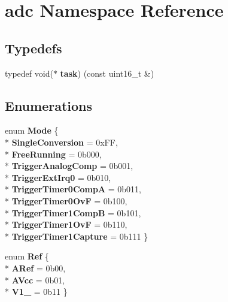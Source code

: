 \hypertarget{namespaceadc}{}\section{adc Namespace Reference}
\label{namespaceadc}
\subsection*{Typedefs}
\begin{DoxyCompactItemize}
\item 
typedef void($\ast$ {\bfseries task}) (const uint16\+\_\+t \&)\hypertarget{namespaceadc_a0e6e6773a0ed848acb0887f1ed3c76ae}{}\label{namespaceadc_a0e6e6773a0ed848acb0887f1ed3c76ae}

\end{DoxyCompactItemize}
\subsection*{Enumerations}
\begin{DoxyCompactItemize}
\item 
enum {\bfseries Mode} \{ \\*
{\bfseries Single\+Conversion} = 0x\+FF, 
\\*
{\bfseries Free\+Running} = 0b000, 
\\*
{\bfseries Trigger\+Analog\+Comp} = 0b001, 
\\*
{\bfseries Trigger\+Ext\+Irq0} = 0b010, 
\\*
{\bfseries Trigger\+Timer0\+CompA} = 0b011, 
\\*
{\bfseries Trigger\+Timer0\+OvF} = 0b100, 
\\*
{\bfseries Trigger\+Timer1\+CompB} = 0b101, 
\\*
{\bfseries Trigger\+Timer1\+OvF} = 0b110, 
\\*
{\bfseries Trigger\+Timer1\+Capture} = 0b111
 \}\hypertarget{namespaceadc_a8094fa55ea1a7729bb35c230163c0f8f}{}\label{namespaceadc_a8094fa55ea1a7729bb35c230163c0f8f}

\item 
enum {\bfseries Ref} \{ \\*
{\bfseries A\+Ref} = 0b00, 
\\*
{\bfseries A\+Vcc} = 0b01, 
\\*
{\bfseries V1\+\_} = 0b11
 \}\hypertarget{namespaceadc_adcbc814e47ddcec8104b574b02228d97}{}\label{namespaceadc_adcbc814e47ddcec8104b574b02228d97}

\end{DoxyCompactItemize}
